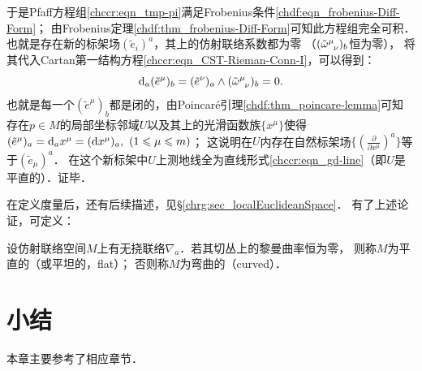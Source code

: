 于是Pfaff方程组\eqref{chccr:eqn_tmp-pi}满足Frobenius条件\eqref{chdf:eqn_frobenius-Diff-Form}；
由Frobenius定理\ref{chdf:thm_frobenius-Diff-Form}可知此方程组完全可积．
也就是存在新的标架场$(\tilde{e}_i)^a$，其上的仿射联络系数都为零
（$(\tilde{\omega} _{\hphantom{\mu} \nu}^\mu)_b$恒为零），
将其代入Cartan第一结构方程\eqref{chccr:eqn_CST-Rieman-Conn-I}，可以得到：
\begin{equation}
	{\rm d}_a (\tilde{e}^\mu)_b =(\tilde{e}^\nu)_a \wedge (\tilde{\omega} _{\hphantom{\mu} \nu}^\mu)_b =0 .
\end{equation}
也就是每一个$(\tilde{e}^\mu)_b$都是闭的，由Poincar\'{e}引理\ref{chdf:thm_poincare-lemma}可知
存在$p\in M$的局部坐标邻域$U$以及其上的光滑函数族$\{x^\mu\}$使得
$ (\tilde{e}^\mu)_a = {\rm d}_a x^\mu = ({\rm d} x^\mu)_a, \ (1\leqslant \mu \leqslant m) $；
这说明在$U$内存在自然标架场$\{(\frac{\partial }{\partial x^\mu})^a\}$等于$(\tilde{e}_\mu)^{a}$．
在这个新标架中$U$上测地线全为直线形式\eqref{chccr:eqn_gd-line}（即$U$是平直的）．证毕．


  

在定义度量后，还有后续描述，见\S\ref{chrg:sec_localEuclideanSpace}．
有了上述论证，可定义：
\begin{definition}\label{chccr:def_flat-curved}
	设仿射联络空间$M$上有无挠联络$\nabla_a$．若其切丛上的黎曼曲率恒为零，
	则称$M$为{\heiti 平直的}（或{\heiti 平坦的}，flat）；  否则称$M$为{\heiti 弯曲的}（curved）．
\end{definition}








\section*{小结}
本章主要参考了\parencite{chen-li-2023-2ed-v1}相应章节．





\endinput